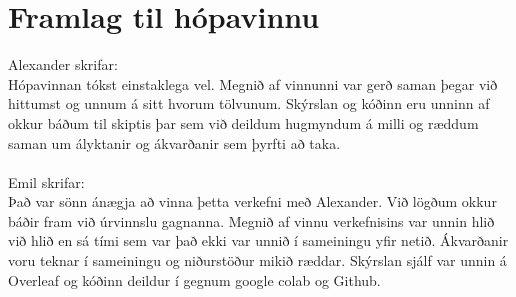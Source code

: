 \documentclass[11pt]{article}
\begin{document}
\section*{Framlag til hópavinnu}
Alexander skrifar:\\
Hópavinnan tókst einstaklega vel. Megnið af vinnunni var gerð saman þegar við hittumst og unnum á sitt hvorum tölvunum. Skýrslan og kóðinn eru unninn af okkur báðum til skiptis þar sem við deildum hugmyndum á milli og ræddum saman um ályktanir og ákvarðanir sem þyrfti að taka.
\\
\\
Emil skrifar:\\
Það var sönn ánægja að vinna þetta verkefni með Alexander. Við lögðum okkur báðir fram við úrvinnslu gagnanna. Megnið af vinnu verkefnisins var unnin hlið við hlið en sá tími sem var það ekki var unnið í sameiningu yfir netið. Ákvarðanir voru teknar í sameiningu og  niðurstöður mikið ræddar. Skýrslan sjálf var unnin á Overleaf og kóðinn deildur í gegnum google colab og Github.
\end{document}
